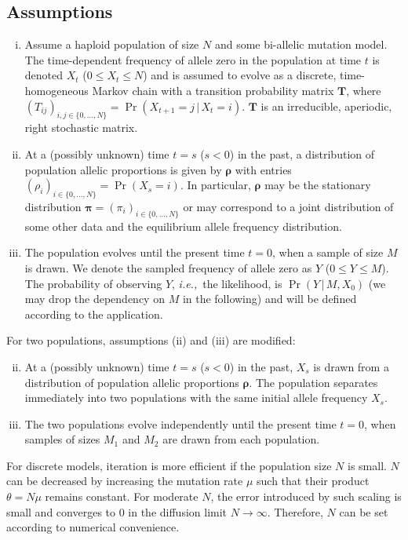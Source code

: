 \documentclass[preprint]{elsarticle}
\newcommand{\bs}[1]{\ensuremath{\boldsymbol{#1}}}
\newcommand\given{{\,|\,}}
\newcommand\ie{{\it i.e.,}}
\newcommand\x[1]{\ensuremath{X_{#1}}}
\newcommand\y{\ensuremath{Y}}
\newcommand\s{\ensuremath{s}}
\begin{document}
\subsection{Assumptions}\label{section:assumptions}
\begin{enumerate}[(i)]
\item Assume a haploid population of size $N$ and some bi-allelic mutation model. The time-dependent frequency of allele zero in the population at time $t$ is denoted $\x{t}$ ($0 \le \x{t} \le N$) and is assumed to evolve as a discrete, time-homogeneous Markov chain with a transition probability matrix $\mathbf{T}$, where $(T_{ij})_{i,j \in \{0, \ldots, N\}} = \Pr(\x{t+1}=j \given \x{t}=i)$. $\mathbf{T}$ is an irreducible, aperiodic, right stochastic matrix.
\item At a (possibly unknown) time $t=\s$ ($\s<0$) in the past, a distribution of population allelic proportions is given by $\bs{\rho}$ with entries $(\rho_{i})_{i \in \{0, \ldots, N\}} = \Pr(\x{\s}=i)$.  In particular, $\bs{\rho}$ may be the stationary distribution $\bs{\pi}=(\pi_i)_{i \in \{0, \ldots, N\}}$ or may correspond to a joint distribution of some other data and the equilibrium allele frequency distribution. 
\item The population evolves until the present time $t=0$, when a sample of size $M$ is drawn.  We denote the sampled frequency of allele zero as $\y$ ($0 \le \y \le M$). The probability of observing $\y$, \ie\ the likelihood, is $\Pr(\y \given M, \x{0})$ (we may drop the dependency on $M$ in the following) and will be defined according to the application.
\end{enumerate}

For two populations, assumptions (ii) and (iii) are modified:
\begin{enumerate}[(i)]
\setcounter{enumi}{1}
\item At a (possibly unknown) time $t=\s$ ($\s<0$) in the past, $\x{\s}$ is drawn from a distribution of population allelic proportions $\bs{\rho}$. The population separates immediately into two populations with the same initial allele frequency $\x{\s}$. 
\item The two populations evolve independently until the present time $t=0$, when samples of sizes $M_1$ and $M_2$ are drawn from each population.
\end{enumerate}

For discrete models, iteration is more efficient if the population size $N$ is small. $N$ can be decreased by increasing the mutation rate $\mu$ such that their product $\theta=N \mu$ remains constant. For moderate $N$, the error introduced by such scaling is small and converges to $0$ in the diffusion limit $N \to \infty$. Therefore, $N$ can be set according to numerical convenience. %
\end{document}
